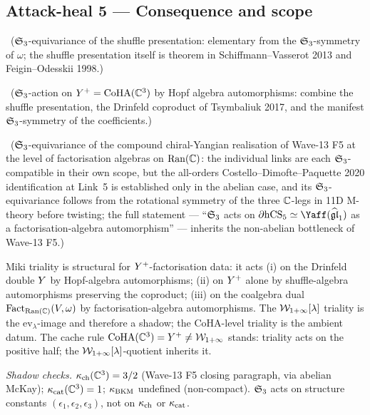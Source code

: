 \subsection*{Attack-heal 5 --- Consequence and scope}

\ClaimStatusTheorem\ ($\mathfrak{S}_{3}$-equivariance of the shuffle presentation:
elementary from the $\mathfrak{S}_{3}$-symmetry of $\omega$; the shuffle
presentation itself is theorem in Schiffmann--Vasserot 2013 and
Feigin--Odesskii 1998.)

\ClaimStatusTheorem\ ($\mathfrak{S}_{3}$-action on $Y^{+} = \mathrm{CoHA}(\mathbb{C}^{3})$ by
Hopf algebra automorphisms: combine the shuffle presentation, the
Drinfeld coproduct of Tsymbaliuk 2017, and the manifest
$\mathfrak{S}_{3}$-symmetry of the coefficients.)

\ClaimStatusConjectured\ ($\mathfrak{S}_{3}$-equivariance of the compound
chiral-Yangian realisation of Wave-13 F5 at the level of factorisation
algebras on $\mathrm{Ran}(\mathbb{C})$: the individual links are each $\mathfrak{S}_{3}$-compatible
in their own scope, but the all-orders Costello--Dimofte--Paquette 2020
identification at Link~5 is established only in the abelian case, and
its $\mathfrak{S}_{3}$-equivariance follows from the rotational symmetry of the
three $\mathbb{C}$-legs in 11D M-theory before twisting; the full statement
--- ``$\mathfrak{S}_{3}$ acts on $\partial \mathrm{hCS}_{5} \simeq \Yaff(\gghone)$
as a factorisation-algebra automorphism'' --- inherits the non-abelian
bottleneck of Wave-13 F5.)

Miki triality is structural for $Y^{+}$-factorisation data: it acts
(i) on the Drinfeld double $Y$ by Hopf-algebra automorphisms;
(ii) on $Y^{+}$ alone by shuffle-algebra automorphisms preserving
the coproduct; (iii) on the coalgebra dual
$\mathrm{Fact}_{\mathrm{Ran}(\mathbb{C})}(V, \omega)$ by factorisation-algebra automorphisms.
The $\mathcal{W}_{1+\infty}[\lambda]$ triality is the
$\mathrm{ev}_{\lambda}$-image and therefore a shadow; the CoHA-level
triality is the ambient datum.  The cache rule
$\mathrm{CoHA}(\mathbb{C}^{3}) = Y^{+} \neq \mathcal{W}_{1+\infty}$ stands: triality acts on the
positive half; the $\mathcal{W}_{1+\infty}[\lambda]$-quotient inherits it.

\emph{Shadow checks.} $\kappa_{\mathrm{ch}}(\mathbb{C}^{3}) = 3/2$ (Wave-13 F5 closing
paragraph, via abelian McKay); $\kappa_{\mathrm{cat}}(\mathbb{C}^{3}) = 1$; $\kappa_{\mathrm{BKM}}$
undefined (non-compact).  $\mathfrak{S}_{3}$ acts on structure constants
$(\epsilon_{1}, \epsilon_{2}, \epsilon_{3})$, not on $\kappa_{\mathrm{ch}}$ or
$\kappa_{\mathrm{cat}}$.
